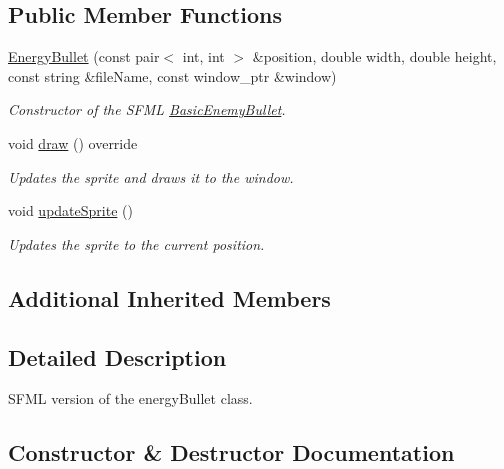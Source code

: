 \subsection*{Public Member Functions}
\begin{DoxyCompactItemize}
\item 
\hyperlink{classGameSFML_1_1EnergyBullet_a4f0effa64f046e9b71a28a4db78dbce7}{Energy\+Bullet} (const pair$<$ int, int $>$ \&position, double width, double height, const string \&file\+Name, const window\+\_\+ptr \&window)
\begin{DoxyCompactList}\small\item\em Constructor of the S\+F\+ML \hyperlink{classGameSFML_1_1BasicEnemyBullet}{Basic\+Enemy\+Bullet}. \end{DoxyCompactList}\item 
void \hyperlink{classGameSFML_1_1EnergyBullet_a41dd2b4aa08fb8af139870c29fa94c00}{draw} () override
\begin{DoxyCompactList}\small\item\em Updates the sprite and draws it to the window. \end{DoxyCompactList}\item 
void \hyperlink{classGameSFML_1_1EnergyBullet_a692e9ae4d828deec21e832986a734ca7}{update\+Sprite} ()
\begin{DoxyCompactList}\small\item\em Updates the sprite to the current position. \end{DoxyCompactList}\end{DoxyCompactItemize}
\subsection*{Additional Inherited Members}


\subsection{Detailed Description}
S\+F\+ML version of the energy\+Bullet class. 

\subsection{Constructor \& Destructor Documentation}
\mbox{\label{classGameSFML_1_1EnergyBullet_a4f0effa64f046e9b71a28a4db78dbce7}} 
